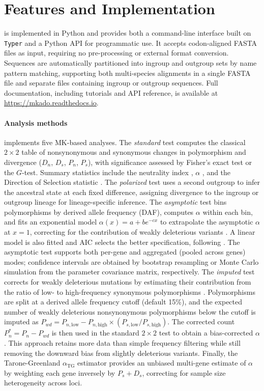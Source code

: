 \section{Features and Implementation}

\mkado is implemented in Python
and provides both a command-line interface built on
\texttt{Typer} and a Python API for programmatic use.
It accepts codon-aligned FASTA files as input,
requiring no pre-processing or external format conversion.
Sequences are automatically partitioned into ingroup and outgroup sets
by name pattern matching,
supporting both multi-species alignments in a single FASTA file
and separate files containing ingroup or outgroup sequences.
Full documentation, including tutorials and API reference,
is available at \url{https://mkado.readthedocs.io}.

\paragraph{Analysis methods}
\mkado implements five MK-based analyses.
The \textit{standard} test computes the classical $2 \times 2$ table
of nonsynonymous and synonymous changes
in polymorphism and divergence ($D_n$, $D_s$, $P_n$, $P_s$),
with significance assessed by Fisher's exact test
or the $G$-test.
Summary statistics include the neutrality index \citep[NI;][]{rand1996},
$\alpha$ \citep{smith2002},
and the Direction of Selection statistic
\citep[DoS;][]{stoletzki2011}.
The \textit{polarized} test uses a second outgroup
to infer the ancestral state at each fixed difference,
assigning divergence to the ingroup or outgroup lineage
for lineage-specific inference.
The \textit{asymptotic} test bins polymorphisms
by derived allele frequency (DAF),
computes $\alpha$ within each bin,
and fits an exponential model $\alpha(x) = a + b e^{-cx}$
to extrapolate the asymptotic $\alpha$ at $x = 1$,
correcting for the contribution of weakly deleterious variants
\citep{messer2013}.
A linear model is also fitted
and AIC selects the better specification,
following \citet{haller2017}.
The asymptotic test supports both per-gene
and aggregated (pooled across genes) modes;
confidence intervals are obtained by bootstrap resampling
or Monte Carlo simulation from the parameter covariance matrix,
respectively.
The \textit{imputed} test corrects for weakly deleterious mutations
by estimating their contribution from the ratio
of low- to high-frequency synonymous polymorphisms
\citep{murga-moreno2022}.
Polymorphisms are split at a derived allele frequency cutoff
(default 15\%),
and the expected number of weakly deleterious nonsynonymous
polymorphisms below the cutoff is imputed as
$P_{wd} = P_{n,\text{low}} - P_{n,\text{high}} \times
(P_{s,\text{low}} / P_{s,\text{high}})$.
The corrected count $P_{n}^{*} = P_n - P_{wd}$
is then used in the standard $2 \times 2$ test
to obtain a bias-corrected $\alpha$.
This approach retains more data than simple frequency filtering
while still removing the downward bias from slightly deleterious
variants.
Finally, the Tarone-Greenland $\alpha_\text{TG}$ estimator
\citep{stoletzki2011}
provides an unbiased multi-gene estimate of $\alpha$
by weighting each gene inversely by $P_s + D_s$,
correcting for sample size heterogeneity across loci.

